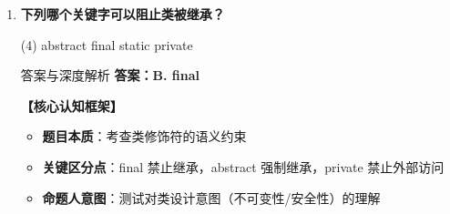\documentclass[12pt, a4paper]{ctexart}
\begin{document}
\begin{enumerate}[label=\textbf{\arabic*.}, leftmargin=*, itemsep=1.5em]
\begin{bluebox}{答案与深度解析}
		      \textbf{【应背诵知识点】}
		      \begin{itemize}[leftmargin=*, nosep]
			      \item 数组是对象，赋值是引用传递
			      \item 深拷贝需显式复制内容
		      \end{itemize}
	      \end{bluebox}

	\item \textbf{下列哪个关键字可以阻止类被继承？}
	      \begin{tasks}(4)
		      \task abstract \task final \task static \task private
	      \end{tasks}
	      \begin{bluebox}{答案与深度解析}
		      \textbf{答案：B. final}

		      \textbf{【核心认知框架】}
		      \begin{itemize}[leftmargin=*, nosep]
			      \item \textbf{题目本质}：考查类修饰符的语义约束
			      \item \textbf{关键区分点}：final 禁止继承，abstract 强制继承，private 禁止外部访问
			      \item \textbf{命题人意图}：测试对类设计意图（不可变性/安全性）的理解
		      \end{itemize}


\end{bluebox}
\end{enumerate}
\end{document}
